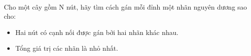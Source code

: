  

Cho một cây gồm N nút, hãy tìm cách gán mỗi đỉnh một nhãn nguyên dương sao cho:
\begin{itemize}
	\item Hai nút có cạnh nối được gán bởi hai nhãn khác nhau.
	\item Tổng giá trị các nhãn là nhỏ nhất.
\end{itemize}